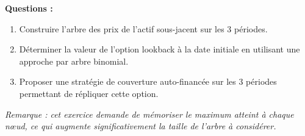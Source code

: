 \documentclass[12pt,a4paper]{article}
\begin{document}
\textbf{Questions :}

\begin{enumerate}
    \item Construire l’arbre des prix de l’actif sous-jacent sur les 3 périodes.
    \item Déterminer la valeur de l’option lookback à la date initiale en utilisant une approche par arbre binomial.
    \item Proposer une stratégie de couverture auto-financée sur les 3 périodes permettant de répliquer cette option.
\end{enumerate}

\textit{Remarque : cet exercice demande de mémoriser le maximum atteint à chaque nœud, ce qui augmente significativement la taille de l’arbre à considérer.}
\end{document}
